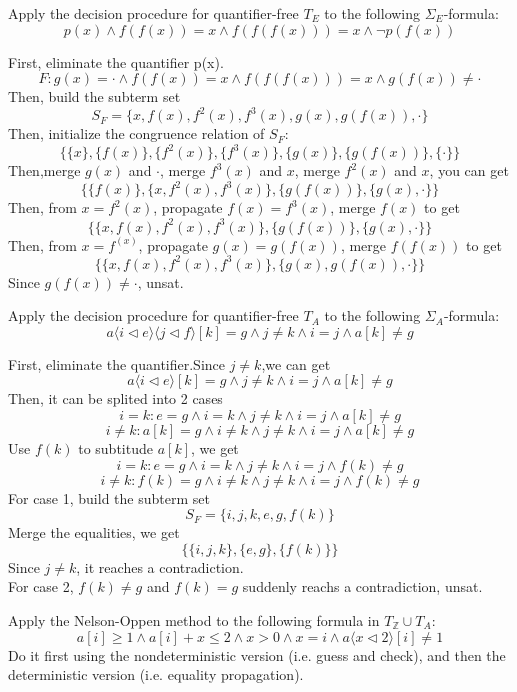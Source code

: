 \documentclass[11pt,a4paper]{article}
\renewcommand{\int}{\mathbb{Z}}
\newcommand{\upd}[2]{\langle #1 \triangleleft #2 \rangle}
\begin{document}
\newpage
{}

\subproblem Apply the decision procedure for quantifier-free $T_E$ to the following $\Sigma_E$-formula:
$$p(x) \land f(f(x)) = x \land f(f(f(x))) = x \land \lnot p(f(x))$$

\begin{solution}
    First, eliminate the quantifier p(x).
    $$F : g(x) = \cdot \land f(f(x)) = x \land f(f(f(x))) = x \land g(f(x)) \neq \cdot$$
    Then, build the subterm set $$S_{F} = \{x, f(x),f^{2}(x),f^3(x),g(x),g(f(x)),\cdot\}$$
    Then, initialize the congruence relation of $S_F$:
    $$\{\{x\}, \{ f(x) \},\{ f^{2}(x)\},\{f^3(x)\},\{g(x)\},\{g(f(x))\},\{\cdot \}\} $$
    Then,merge $g(x)$ and $\cdot$, merge $f^3(x)$ and $x$, merge $f^2(x)$ and $x$, you can get
    $$\{\{f(x)\},\{x, f^{2}(x), f^3(x)\},\{g(f(x))\},\{g(x), \cdot\}\} $$
    Then, from $x = f^{2}(x)$, propagate $f(x) = f^{3}(x)$, merge $f(x)$ to get 
     $$\{\{x, f(x), f^{2}(x), f^3(x)\},\{g(f(x))\},\{g(x), \cdot\}\} $$
     Then, from $x = f^(x)$, propagate $g(x) = g(f(x))$, merge $f(f(x))$ to get 
  $$\{\{x, f(x), f^{2}(x), f^3(x)\},\{g(x),g(f(x)), \cdot\}\} $$   
  Since $g(f(x)) \neq \cdot$, unsat.
\end{solution}

\subproblem Apply the decision procedure for quantifier-free $T_A$ to the following $\Sigma_A$-formula:
$$a\upd{i}{e}\upd{j}{f}[k]=g \land j\not=k \land i=j \land a[k]\not=g$$

\begin{solution}
    First, eliminate the quantifier.Since $j \neq k$,we can get\\
    $$a\upd{i}{e}[k]=g \land j\not=k \land i=j \land a[k]\not=g$$
    Then, it can be splited into 2 cases
 $$i = k:     e=g \land i = k \land j\not=k \land i=j \land a[k]\not=g$$
  $$i \neq k:     a[k]=g \land i \neq k \land j\not=k \land i=j \land a[k]\not=g$$
  Use $f(k)$ to subtitude $a[k]$, we get
 $$i = k:     e=g \land i = k \land j\not=k \land i=j \land f(k) \not=g$$
$$i \neq k:     f(k)=g \land i \neq k \land j\not=k \land i=j \land f(k) \not=g$$
For case 1, build the subterm set $$S_{F} = \{i, j, k,e, g, f(k)\}$$
Merge the equalities, we get $$\{ \{i, j, k\}, \{e, g\}, \{f(k)\} \}$$
Since $j \neq k$, it reaches a contradiction.\\
For case 2, $f(k) \not=g$ and $f(k) = g$ suddenly reachs a contradiction, unsat.
\end{solution}

\subproblem Apply the Nelson-Oppen method to the following formula in $T_\int \cup T_A$:
$$a[i] \ge 1 \land a[i]+x \le 2 \land x>0 \land x=i \land a\upd{x}{2}[i]\not=1$$
Do it first using the nondeterministic version (i.e. guess and check), and then the deterministic version (i.e. equality propagation).
\end{document}
